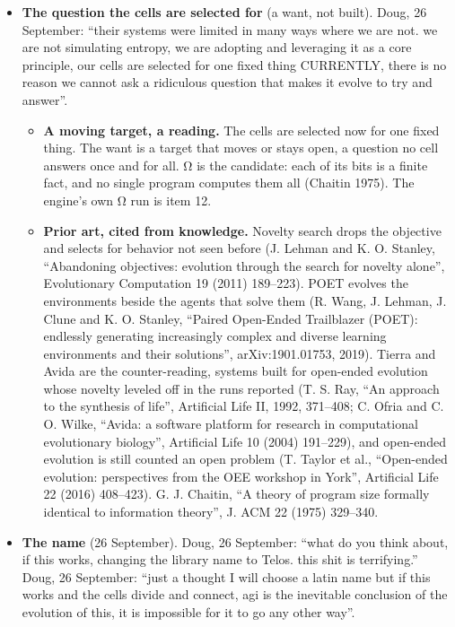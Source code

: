 \begin{enumerate}
\begin{itemize}
\begin{enumerate}
\begin{itemize}
\end{itemize}
\end{enumerate}
\item \textbf{The question the cells are selected for} (a want, not built). Doug, 26 September: “their systems were limited in many ways where we are not. we are not simulating entropy, we are adopting and leveraging it as a core principle, our cells are selected for one fixed thing CURRENTLY, there is no reason we cannot ask a ridiculous question that makes it evolve to try and answer”.

\begin{itemize}
\item \textbf{A moving target, a reading.} The cells are selected now for one fixed thing. The want is a target that moves or stays open, a question no cell answers once and for all. Ω is the candidate: each of its bits is a finite fact, and no single program computes them all (Chaitin 1975). The engine's own Ω run is item 12.
\item \textbf{Prior art, cited from knowledge.} Novelty search drops the objective and selects for behavior not seen before (J. Lehman and K. O. Stanley, “Abandoning objectives: evolution through the search for novelty alone”, Evolutionary Computation 19 (2011) 189–223). POET evolves the environments beside the agents that solve them (R. Wang, J. Lehman, J. Clune and K. O. Stanley, “Paired Open-Ended Trailblazer (POET): endlessly generating increasingly complex and diverse learning environments and their solutions”, arXiv:1901.01753, 2019). Tierra and Avida are the counter-reading, systems built for open-ended evolution whose novelty leveled off in the runs reported (T. S. Ray, “An approach to the synthesis of life”, Artificial Life II, 1992, 371–408; C. Ofria and C. O. Wilke, “Avida: a software platform for research in computational evolutionary biology”, Artificial Life 10 (2004) 191–229), and open-ended evolution is still counted an open problem (T. Taylor et al., “Open-ended evolution: perspectives from the OEE workshop in York”, Artificial Life 22 (2016) 408–423). G. J. Chaitin, “A theory of program size formally identical to information theory”, J. ACM 22 (1975) 329–340.
\end{itemize}
\item \textbf{The name} (26 September). Doug, 26 September: “what do you think about, if this works, changing the library name to Telos. this shit is terrifying.” Doug, 26 September: “just a thought I will choose a latin name but if this works and the cells divide and connect, agi is the inevitable conclusion of the evolution of this, it is impossible for it to go any other way”.


\end{itemize}
\end{enumerate}
